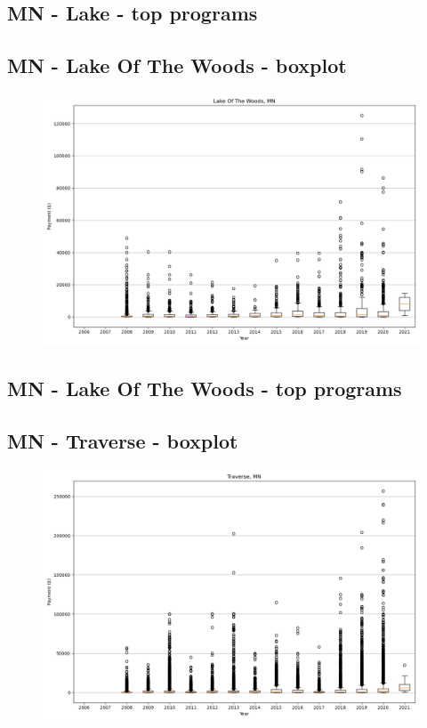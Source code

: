 \subsection*{MN - Lake - top programs}

\newpage
\subsection*{MN - Lake Of The Woods - boxplot}
\begin{figure}[h]
\centering
\includegraphics[width=7in]{../output/boxplots/counties/Lake Of The Woods-MN_boxplot.png}
\end{figure}


\subsection*{MN - Lake Of The Woods - top programs}

\newpage
\subsection*{MN - Traverse - boxplot}
\begin{figure}[h]
\centering
\includegraphics[width=7in]{../output/boxplots/counties/Traverse-MN_boxplot.png}
\end{figure}


